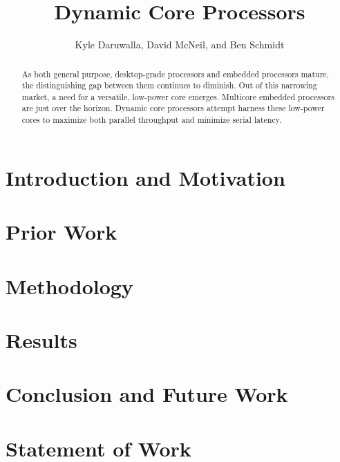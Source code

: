 \documentclass[journal]{IEEEtran}
\begin{document}
\title{Dynamic Core Processors}

\author{Kyle Daruwalla, David McNeil, and Ben Schmidt \\ }%


\maketitle

\begin{abstract}
As both general purpose, desktop-grade processors and embedded processors mature, the distinguishing gap between them continues to diminish. Out of this narrowing market, a need for a versatile, low-power core emerges. Multicore embedded processors are just over the horizon. Dynamic core processors attempt harness these low-power cores to maximize both parallel throughput and minimize serial latency.
\end{abstract}

\section{Introduction and Motivation}


\section{Prior Work}


\section{Methodology}


\section{Results}


\section{Conclusion and Future Work}


\section{Statement of Work}

\end{document}
